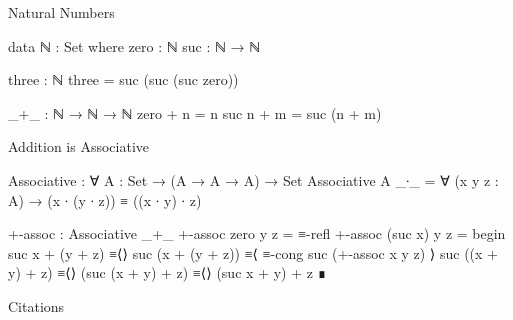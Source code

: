 \documentclass{beamer}
\begin{document}
\begin{frame}{Natural Numbers}
  \begin{code}
    data ℕ : Set where
      zero : ℕ
      suc  : ℕ → ℕ

    three : ℕ
    three = suc (suc (suc zero))

    _+_ : ℕ → ℕ → ℕ
    zero + n = n
    suc n + m = suc (n + m)
  \end{code}
\end{frame}

\begin{frame}{Addition is Associative}
  \begin{code}
    Associative : ∀ {A : Set} → (A → A → A) → Set
    Associative {A} _∙_
      = ∀ (x y z : A) → (x ∙ (y ∙ z)) ≡ ((x ∙ y) ∙ z)

    +-assoc : Associative _+_
    +-assoc zero y z = ≡-refl
    +-assoc (suc x) y z = begin
      suc x + (y + z)   ≡⟨⟩
      suc (x + (y + z)) ≡⟨ ≡-cong suc (+-assoc x y z) ⟩
      suc ((x + y) + z) ≡⟨⟩
      (suc (x + y) + z) ≡⟨⟩
      (suc x + y) + z   ∎
  \end{code}
\end{frame}

\begin{frame}[allowframebreaks]{Citations}
  \nocite{gnu-parallel}
  
  
\end{frame}
\end{document}
